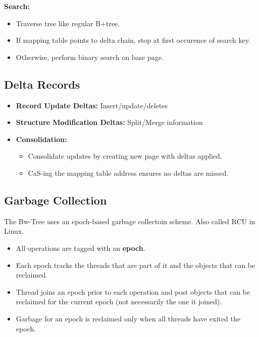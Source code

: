 \documentclass[11pt]{article}
\begin{document}
\textbf{Search:}
\begin{itemize}
    \item
    Traverse tree like regular B+tree.
    
    \item
    If mapping table points to delta chain, stop at first occurence of search key.
    
    \item
    Otherwise, perform binary search on base page.
\end{itemize}

\subsection*{Delta Records}
\begin{itemize}
    \item \textbf{Record Update Deltas:}
    Insert/update/deletes
    
    \item \textbf{Structure Modification Deltas:}
    Split/Merge information
    
    \item \textbf{Consolidation:}
    \begin{itemize}
        \item
        Consolidate updates by creating new page with deltas applied.
        
        \item
        CaS-ing the mapping table address ensures no deltas are missed.
    \end{itemize}
\end{itemize}

\subsection*{Garbage Collection}
The Bw-Tree uses an epoch-based garbage collectoin scheme. Also called RCU in Linux.

\begin{itemize}
    \item
    All operations are tagged with an \textbf{epoch}.
    
    \item
    Each epoch tracks the threads that are part of it and the objects that can be reclaimed.
    
    \item
    Thread joins an epoch prior to each operation and post objects that can be reclaimed for 
    the current epoch (not necessarily the one it joined).
    
    \item
    Garbage for an epoch is reclaimed only when all threads have exited the epoch.
\end{itemize}

\newpage


\end{document}
